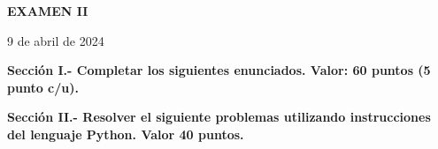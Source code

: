\documentclass[10pt,addpoints]{exam}
\begin{document}
\begin{center}
  \sffamily\textbf{EXAMEN II}
\end{center}
\begin{flushright}
9 de abril de 2024
\end{flushright}

\begin{questions}
\begin{EnvFullwidth}
  \sffamily\textbf{Sección I.- Completar los siguientes enunciados.
  Valor: 60 puntos (5 punto c/u).}
\end{EnvFullwidth}















\end{questions}

\begin{questions}
\begin{EnvFullwidth}
  \sffamily\textbf{Sección II.- Resolver el siguiente problemas utilizando
  instrucciones del lenguaje Python. Valor 40 puntos.}
\end{EnvFullwidth}



\end{questions}
\end{document}
